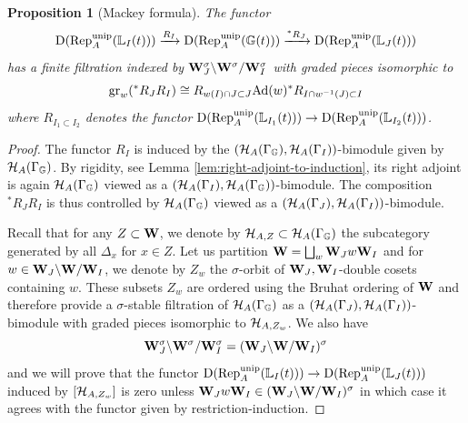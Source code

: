 \documentclass[a4paper, 10pt, oneside, reqno]{amsart}
\theoremstyle{plain}
\newtheorem{prop}[thm]{Proposition}
\theoremstyle{definition}
\theoremstyle{remark}
\newcommand{\Gbb}{\mathbb{G}}
\newcommand{\Lbb}{\mathbb{L}}
\begin{document}
\begin{prop}[Mackey formula]\label{prop:mackay-for-parab-induction}
The functor 
$$\DD(\Rep_A^{\unip}(\Lbb_I(t))) \xrightarrow{R_{I}}  \DD(\Rep_A^{\unip}(\Gbb(t))) \xrightarrow{{^*}R_J} \DD(\Rep_A^{\unip}(\Lbb_J(t)))$$
has a finite filtration indexed by $\mathbf{W}_J^{\sigma} \backslash \mathbf{W}^{\sigma}/\mathbf{W}_{I}^{\sigma}$ with graded pieces isomorphic to 
$$\mathrm{gr}_w({^*}R_JR_{I}) \cong R_{w(I)\cap J \subset J}\mathrm{Ad}(w){^*}R_{I \cap {w^{-1}(J)} \subset I}$$
where $R_{I_1 \subset I_2}$ denotes the functor $\DD(\Rep_A^{\unip}(\Lbb_{I_1}(t))) \to \DD(\Rep_A^{\unip}(\Lbb_{I_2}(t)))$.
\end{prop}

\begin{proof}
The functor $R_I$ is induced by the $(\Hcal_A(\Gamma_{\Gbb}), \Hcal_A(\Gamma_I))$-bimodule given by $\Hcal_A(\Gamma_{\Gbb})$. By rigidity, see Lemma \ref{lem:right-adjoint-to-induction}, its right adjoint is again $\Hcal_A(\Gamma_{\Gbb})$ viewed as a $(\Hcal_A(\Gamma_I),\Hcal_A(\Gamma_{\Gbb}))$-bimodule. The composition ${^*}R_JR_{I}$ is thus controlled by $\Hcal_A(\Gamma_{\Gbb})$ viewed as a $(\mathcal{H}_A(\Gamma_J), \mathcal{H}_A(\Gamma_I))$-bimodule. 

Recall that for any $Z \subset \mathbf{W}$, we denote by $\Hcal_{A,Z} \subset \Hcal_A(\Gamma_{\Gbb})$ the subcategory generated by all $\Delta_x$ for $x \in Z$. Let us partition $\mathbf{W} = \bigsqcup_{w} \mathbf{W}_J w \mathbf{W}_I$ and for $w \in \mathbf{W}_J \backslash \mathbf{W}/\mathbf{W}_I$, we denote by $Z_w$ the $\sigma$-orbit of $\mathbf{W}_J,\mathbf{W}_I$-double cosets containing $w$. These subsets $Z_w$ are ordered using the Bruhat ordering of $\mathbf{W}$ and therefore provide a $\sigma$-stable filtration of $\Hcal_{A}(\Gamma_{\Gbb})$ as a $(\mathcal{H}_A(\Gamma_J), \mathcal{H}_A(\Gamma_I))$-bimodule with graded pieces isomorphic to $\mathcal{H}_{A,Z_w}$. We also have 
$$\mathbf{W}_J^{\sigma} \backslash \mathbf{W}^{\sigma}/\mathbf{W}_{I}^{\sigma} = (\mathbf{W}_J \backslash \mathbf{W}/\mathbf{W}_{I})^{\sigma}$$ 
and we will prove that the functor $\DD(\Rep_A^{\unip}(\Lbb_I(t))) \to \DD(\Rep_A^{\unip}(\Lbb_J(t)))$ induced by $[\mathcal{H}_{A,Z_w}]$ is zero unless $\mathbf{W}_J w \mathbf{W}_I \in (\mathbf{W}_J \backslash \mathbf{W}/\mathbf{W}_{I})^{\sigma}$ in which case it agrees with the functor given by restriction-induction. 


\end{proof}
\end{document}
